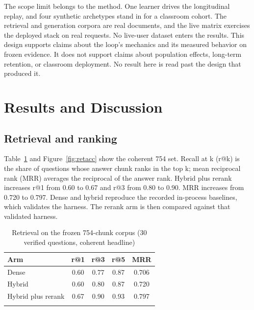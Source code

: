 \documentclass[sn-mathphys,Numbered]{sn-jnl}%
\theoremstyle{thmstyleone}%
\theoremstyle{thmstyletwo}%
\theoremstyle{thmstylethree}%
\begin{document}
The scope limit belongs to the method. One learner drives the longitudinal replay, and four synthetic archetypes stand in for a classroom cohort. The retrieval and generation corpora are real documents, and the live matrix exercises the deployed stack on real requests. No live-user dataset enters the results. This design supports claims about the loop's mechanics and its measured behavior on frozen evidence. It does not support claims about population effects, long-term retention, or classroom deployment. No result here is read past the design that produced it.

\section{Results and Discussion}\label{sec4}

\subsection{Retrieval and ranking}\label{subsec41}

Table~\ref{tab:retrieval} and Figure~\ref{fig:retacc} show the coherent 754 set. Recall at k (r@k) is the share of questions whose answer chunk ranks in the top k; mean reciprocal rank (MRR) averages the reciprocal of the answer rank. Hybrid plus rerank increases r@1 from 0.60 to 0.67 and r@3 from 0.80 to 0.90. MRR increases from 0.720 to 0.797. Dense and hybrid reproduce the recorded in-process baselines, which validates the harness. The rerank arm is then compared against that validated harness.

\begin{table}[htbp]
\caption{Retrieval on the frozen 754-chunk corpus (30 verified questions, coherent headline)}\label{tab:retrieval}%
\begin{tabular*}{\textwidth}{@{\extracolsep\fill}lcccc@{}}
\toprule
Arm & r@1 & r@3 & r@5 & MRR \\
\midrule
Dense & 0.60 & 0.77 & 0.87 & 0.706 \\
Hybrid & 0.60 & 0.80 & 0.87 & 0.720 \\
Hybrid plus rerank & 0.67 & 0.90 & 0.93 & 0.797 \\
\botrule
\end{tabular*}
\end{table}
\end{document}
